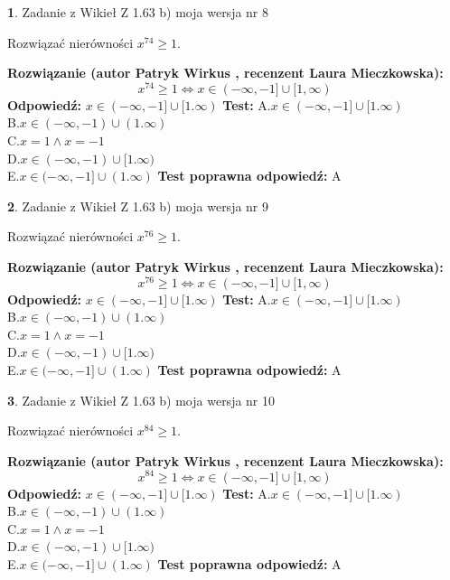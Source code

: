 \documentclass[12pt, a4paper]{article}
\theoremstyle{definition} %
\newtheorem{zad}{}
\newcommand{\zadStart}[1]{\begin{zad}#1\newline}
\newcommand{\zadStop}{\end{zad}}
\newcommand{\rozwStart}[2]{\noindent \textbf{Rozwiązanie (autor #1 , recenzent #2): }\newline}
\newcommand{\rozwStop}{\newline}
\newcommand{\odpStart}{\noindent \textbf{Odpowiedź:}\newline}
\newcommand{\odpStop}{\newline}
\newcommand{\testStart}{\noindent \textbf{Test:}\newline}
\newcommand{\testStop}{\newline}
\newcommand{\kluczStart}{\noindent \textbf{Test poprawna odpowiedź:}\newline}
\newcommand{\kluczStop}{\newline}
\begin{document}
\zadStart{Zadanie z Wikieł Z 1.63 b) moja wersja nr 8}

Rozwiązać nierówności $x^{74} \ge 1$.
\zadStop
\rozwStart{Patryk Wirkus}{Laura Mieczkowska}
$$x^{74} \ge 1 \iff x \in (-\infty,-1] \cup [1,\infty)$$
\rozwStop
\odpStart
$x \in (-\infty,-1] \cup [1.\infty)$
\odpStop
\testStart
A.$x \in (-\infty,-1] \cup [1.\infty)$\\ B.$x \in (-\infty,-1) \cup (1.\infty)$\\ C.$x = 1 \wedge x = -1$\\ D.$x \in (-\infty,-1) \cup [1.\infty)$\\ E.$x \in (-\infty,-1] \cup (1.\infty)$
\testStop
\kluczStart
A
\kluczStop



\zadStart{Zadanie z Wikieł Z 1.63 b) moja wersja nr 9}

Rozwiązać nierówności $x^{76} \ge 1$.
\zadStop
\rozwStart{Patryk Wirkus}{Laura Mieczkowska}
$$x^{76} \ge 1 \iff x \in (-\infty,-1] \cup [1,\infty)$$
\rozwStop
\odpStart
$x \in (-\infty,-1] \cup [1.\infty)$
\odpStop
\testStart
A.$x \in (-\infty,-1] \cup [1.\infty)$\\ B.$x \in (-\infty,-1) \cup (1.\infty)$\\ C.$x = 1 \wedge x = -1$\\ D.$x \in (-\infty,-1) \cup [1.\infty)$\\ E.$x \in (-\infty,-1] \cup (1.\infty)$
\testStop
\kluczStart
A
\kluczStop



\zadStart{Zadanie z Wikieł Z 1.63 b) moja wersja nr 10}

Rozwiązać nierówności $x^{84} \ge 1$.
\zadStop
\rozwStart{Patryk Wirkus}{Laura Mieczkowska}
$$x^{84} \ge 1 \iff x \in (-\infty,-1] \cup [1,\infty)$$
\rozwStop
\odpStart
$x \in (-\infty,-1] \cup [1.\infty)$
\odpStop
\testStart
A.$x \in (-\infty,-1] \cup [1.\infty)$\\ B.$x \in (-\infty,-1) \cup (1.\infty)$\\ C.$x = 1 \wedge x = -1$\\ D.$x \in (-\infty,-1) \cup [1.\infty)$\\ E.$x \in (-\infty,-1] \cup (1.\infty)$
\testStop
\kluczStart
A
\kluczStop
\end{document}

